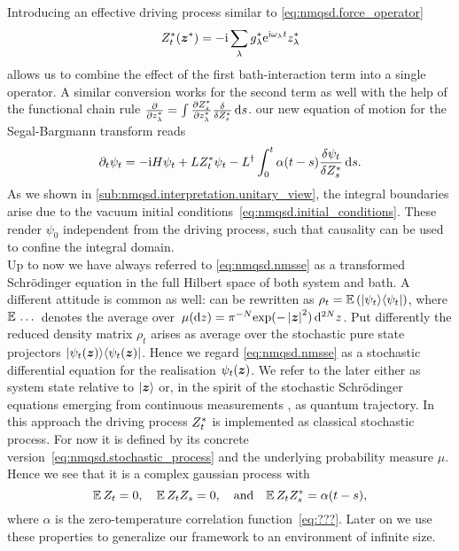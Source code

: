 Introducing an effective driving process similar to \autoref{eq:nmqsd.force_operator}
\begin{equation}
  \ZZ_t(\cc\zz) = - \ii \sum_\lambda \cc g_\lambda \exp[\ii \omega_\lambda t] \cc z_\lambda
  \label{eq:nmqsd.stochastic_process}
\end{equation}
allows us to combine the effect of the first bath-interaction term into a single operator.
A similar conversion works for the second term as well with the help of the functional chain rule $\frac{\partial}{\partial {z}^*_\lambda} = \int \frac{\partial {Z}^*_s}{\partial{z}^*_\lambda} \frac{\delta}{\delta {Z}^*_s} \, \mathrm{d} s$.
our new equation of motion for the Segal-Bargmann transform reads
\begin{equation}
  \partial_t \psi_t = -\mathrm{i}H\psi_t  +  L{Z}^*_t\psi_t  -  L^\dagger \int_0^t \alpha(t-s) \frac{\delta \psi_t}{\delta {Z}^*_s} \, \mathrm{d} s.
  \label{eq:nmqsd.nmsse}
\end{equation}
As we shown in \autoref{sub:nmqsd.interpretation.unitary_view}, the integral boundaries arise due to the vacuum initial conditions~\ref{eq:nmqsd.initial_conditions}.
These render $\psi_0$ independent from the driving process, such that causality can be used to confine the integral domain.\\


Up to now we have always referred to \autoref{eq:nmqsd.nmsse} as a transformed Schrödinger equation in the full Hilbert space of both system and bath.
A different attitude is common as well:  can be rewritten as $\rho_t = \E[\ket{\psi_t}\bra{\psi_t}]$, where $\E\,\dots$ denotes the average over $\mudz = \pi^{-N} \exp(-\abs{\vec z}^2) \dd^{2N}z$.
Put differently the reduced density matrix $\rho_t$ arises as average over the stochastic pure state projectors $| \psi_t(\boldsymbol{z}) \rangle\langle \psi_t(\boldsymbol{z}) |$.
Hence we regard \autoref{eq:nmqsd.nmsse} as a stochastic differential equation for the realisation $\psi_t(\boldsymbol{z})$.
We refer to the later either as system state relative to $| \boldsymbol{z} \rangle$ or, in the spirit of the stochastic Schrödinger equations emerging from continuous measurements \cite{Ca93_quantum_optics}, as quantum trajectory.
In this approach the driving process ${Z}^*_t$ is implemented as classical stochastic process.
For now it is defined by its concrete version~\ref{eq:nmqsd.stochastic_process} and the underlying probability measure $\mu$.
Hence we see that it is a complex gaussian process with
\begin{equation}
  \E\,Z_t = 0, \quad \E\,Z_t Z_s =0, \quad\mbox{and}\quad \E\,Z_t \ZZ_s = \alpha(t-s),
  \label{eq:nmqsd.process_properties}
\end{equation}
where $\alpha$ is the zero-temperature correlation function~\ref{eq:???}.
Later on we use these properties to generalize our framework to an environment of infinite size.

